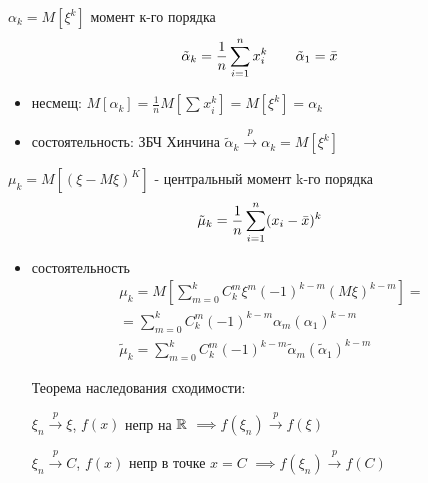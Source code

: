 \documentclass{article}
\begin{document}
\begin{enumerate}
    $\alpha_k=M[\xi^{k}]$ момент к-го порядка
    \[
      \tilde{\alpha}_k=\frac{1}{n}\sum_{i=1}^{n}x_i^{k} \qquad \tilde{\alpha}_1=\bar{x} \\ 
    \]
    \hr
    \begin{itemize}
      \item несмещ: $M[\alpha_k]=\frac{1}{n}M[\sum_{}^{}x_i^{k}]=M[\xi^{k}]=\alpha_k$
      \item состоятельность: ЗБЧ Хинчина $\tilde{\alpha}_k \overset{p}{\to}\alpha_k=M[\xi^{k}]$
    \end{itemize}
    \hr

    $\mu_k=M[(\xi-M\xi)^{K}]$ - центральный момент k-го порядка
    \[
      \tilde{\mu}_k=\frac{1}{n}\sum_{i=1}^{n}(x_i-\bar{x})^{k} \\ 
    \]
    \hr
    \begin{itemize}
      \item состоятельность
        \begin{gather*}
           \mu_k=M[\sum_{m=0}^{k}C_k^{m}\xi^{m}(-1)^{k-m}(M\xi)^{k-m}]= \\
           = \sum_{m=0}^{k}C_k^{m}(-1)^{k-m}\alpha_m (\alpha_1)^{k-m} \\ 
           \tilde{\mu}_k=\sum_{m=0}^{k}C_k^{m}(-1)^{k-m}\tilde{\alpha}_m (\tilde{\alpha}_1)^{k-m} 
        \end{gather*}

        Теорема наследования сходимости:

        $\xi_n \overset{p}{\to} \xi$, $f(x)$ непр на $\mathbb{R}$ $\implies f(\xi_n) \overset{p}{\to} f(\xi)$

        $\xi_n \overset{p}{\to} C$, $f(x)$ непр в точке $x=C$ $\implies f(\xi_n) \overset{p}{\to} f(C)$


\end{itemize}
\end{enumerate}
\end{document}
